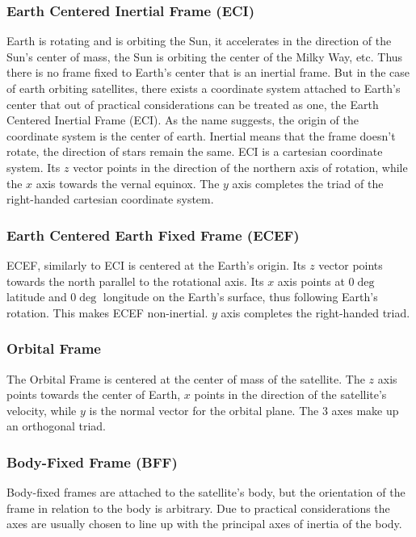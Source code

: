 \subsubsection{Earth Centered Inertial Frame (ECI)}
Earth is rotating and is orbiting the Sun, it accelerates in the direction of the Sun's center of mass, the Sun is orbiting the center of the Milky Way, etc. Thus there is no frame fixed to Earth's center that is an inertial frame. But in the case of earth orbiting satellites, there exists a coordinate system attached to Earth's center that out of practical considerations can be treated as one, the Earth Centered Inertial Frame (ECI).
As the name suggests, the origin of the coordinate system is the center of earth. Inertial means that the frame doesn't rotate, the direction of stars remain the same. 
ECI is a cartesian coordinate system. Its $z$ vector points in the direction of the northern axis of rotation, while the $x$ axis towards the vernal equinox. The $y$ axis completes the triad of the right-handed cartesian coordinate system.




\subsubsection{Earth Centered Earth Fixed Frame (ECEF)}

ECEF, similarly to ECI is centered at the Earth's origin. Its $z$ vector points towards the north parallel to the rotational axis. Its $x$ axis points at $0\deg$ latitude and $0\deg$ longitude on the Earth's surface, thus following Earth's rotation. This makes ECEF non-inertial. $y$ axis completes the right-handed triad.

\subsubsection{Orbital Frame}

The Orbital Frame is centered at the center of mass of the satellite. The $z$ axis points towards the center of Earth, $x$ points in the direction of the satellite's velocity, while $y$ is the normal vector for the orbital plane. The 3 axes make up an orthogonal triad.


\subsubsection{Body-Fixed Frame (BFF)}

Body-fixed frames are attached to the satellite's body, but the orientation of the frame in relation to the body is arbitrary. Due to practical considerations the axes are usually chosen to line up with the principal axes of inertia of the body.
